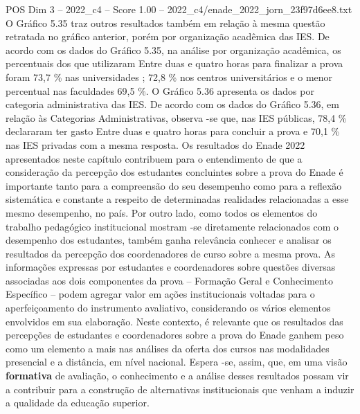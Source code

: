 \begin{textsample}{POS Dim 3 – 2022\_c4 – Score 1.00 – 2022\_c4/enade\_2022\_jorn\_23f97d6ee8.txt}
O Gráfico 5.35 traz outros resultados também em relação à mesma questão retratada no gráfico anterior, porém por organização acadêmica das IES.
De acordo com os dados do Gráfico 5.35, na análise por organização acadêmica, os percentuais dos que utilizaram Entre duas e quatro horas para finalizar a prova foram 73,7 \% nas universidades ; 72,8 \% nos centros universitários e o menor percentual nas faculdades 69,5 \%.
O Gráfico 5.36 apresenta os dados por categoria administrativa das IES.
De acordo com os dados do Gráfico 5.36, em relação às Categorias Administrativas, observa -se que, nas IES públicas, 78,4 \% declararam ter gasto Entre duas e quatro horas para concluir a prova e 70,1 \% nas IES privadas com a mesma resposta.
Os resultados do Enade 2022 apresentados neste capítulo contribuem para o entendimento de que a consideração da percepção dos estudantes concluintes sobre a prova do Enade é importante tanto para a compreensão do seu desempenho como para a reflexão sistemática e constante a respeito de determinadas realidades relacionadas a esse mesmo desempenho, no país.
Por outro lado, como todos os elementos do trabalho pedagógico institucional mostram -se diretamente relacionados com o desempenho dos estudantes, também ganha relevância conhecer e analisar os resultados da percepção dos coordenadores de curso sobre a mesma prova.
As informações expressas por estudantes e coordenadores sobre questões diversas associadas aos dois componentes da prova – Formação Geral e Conhecimento Específico – podem agregar valor em ações institucionais voltadas para o aperfeiçoamento do instrumento avaliativo, considerando os vários elementos envolvidos em sua elaboração.
Neste contexto, é relevante que os resultados das percepções de estudantes e coordenadores sobre a prova do Enade ganhem peso como um elemento a mais nas análises da oferta dos cursos nas modalidades presencial e a distância, em nível nacional.
Espera -se, assim, que, em uma visão \textbf{formativa} de avaliação, o conhecimento e a análise desses resultados possam vir a contribuir para a construção de alternativas institucionais que venham a induzir a qualidade da educação superior.

\end{textsample}
